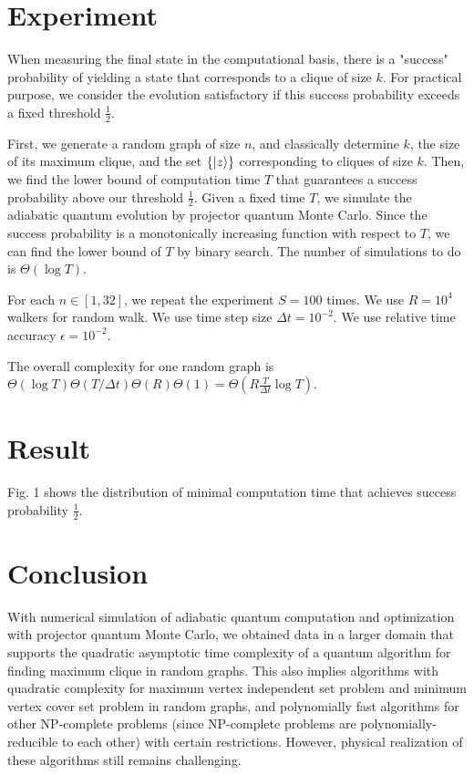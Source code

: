 \documentclass[12pt]{article}
\begin{document}
\section{Experiment}

When measuring the final state in the computational basis, there is a "success" probability of yielding a state that corresponds to a clique of size $k$. For practical purpose, we consider the evolution satisfactory if this success probability exceeds a fixed threshold $\frac{1}{2}$. 

First, we generate a random graph of size $n$, and classically determine $k$, the size of its maximum clique, and the set $\{\ket{z}\}$ corresponding to cliques of size $k$. Then, we find the lower bound of computation time $T$ that guarantees a success probability above our threshold $\frac{1}{2}$. Given a fixed time $T$, we simulate the adiabatic quantum evolution by projector quantum Monte Carlo. Since the success probability is a monotonically increasing function with respect to $T$, we can find the lower bound of $T$ by binary search. The number of simulations to do is $\Theta(\log{T})$. 

For each $n \in [1, 32]$, we repeat the experiment $S = 100$ times. We use $R = 10^4$ walkers for random walk. We use time step size $\Delta{t} = 10^{-2}$. We use relative time accuracy $\epsilon = 10^{-2}$. 

The overall complexity for one random graph is $\Theta(\log{T}) \Theta(T/\Delta{t}) \Theta(R) \Theta(1) = \Theta(R \frac{T}{\Delta{t}} \log{T})$. 

\section{Result}

Fig. 1 shows the distribution of minimal computation time that achieves success probability $\frac{1}{2}$. 

\section{Conclusion}

With numerical simulation of adiabatic quantum computation and optimization with projector quantum Monte Carlo, we obtained data in a larger domain that supports the quadratic asymptotic time complexity of a quantum algorithm for finding maximum clique in random graphs. This also implies algorithms with quadratic complexity for maximum vertex independent set problem and minimum vertex cover set problem in random graphs, and polynomially fast algorithms for other NP-complete problems (since NP-complete problems are polynomially-reducible to each other) with certain restrictions. However, physical realization of these algorithms still remains challenging. 
\end{document}
